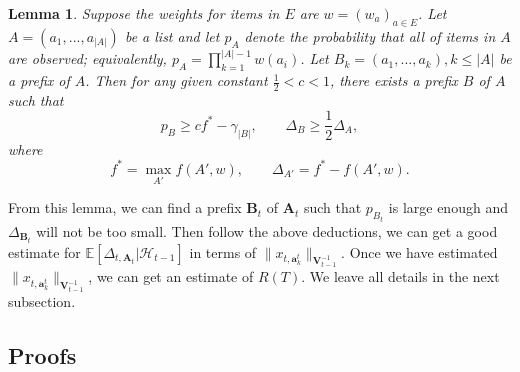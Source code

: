 \documentclass{article}
\newcommand{\EE}{\mathbb{E}}
\newcommand{\bA}{\mathbf{A}}
\newcommand{\ba}{\mathbf{a}}
\newcommand{\bB}{\mathbf{B}}
\newcommand{\bV}{\mathbf{V}}
\newcommand{\cH}{\mathcal{H}}
\newcommand{\abs}[1]{\left| #1 \right|}
\newcommand{\norm}[1]{\| #1 \|}
\newtheorem{lemma}[theorem]{Lemma}%
\begin{document}
\begin{lemma}
\label{lem:prefixExist}
Suppose the weights for items in $E$ are $w = (w_a)_{a \in E}$. Let $A = (a_1, ..., a_{\abs{A}})$ be a list and let $p_A$ denote the probability that all of items in $A$ are observed; equivalently, $p_A = \prod_{k=1}^{\abs{A}-1}w(a_i)$. Let $B_k = (a_1, ..., a_k), k \leq \abs{A}$ be a prefix of $A$. Then for any given constant $\frac{1}{2} < c < 1$, there exists a prefix $B$ of $A$ such that
$$
p_B \geq c f^* - \gamma_{\abs{B}}, \qquad \Delta_B \geq \frac{1}{2} \Delta_A,
$$
where
$$
f^* = \max_{A'} f(A', w), \qquad \Delta_{A'} = f^* - f(A', w).
$$
\end{lemma}

From this lemma, we can find a prefix $\bB_t$ of $\bA_t$ such that $p_{B_t}$ is large enough and $\Delta_{\bB_t}$ will not be too small. Then follow the above deductions, we can get a good estimate for $\EE[\Delta_{t, \bA_t}|\cH_{t-1}]$ in terms of $\norm{x_{t,\ba_k^t}}_{\bV_{t-1}^{-1}}$. Once we have estimated $\norm{x_{t,\ba_k^t}}_{\bV_{t-1}^{-1}}$, we can get an estimate of $R(T)$. We leave all details in the next subsection.


\subsection{Proofs}
\end{document}
